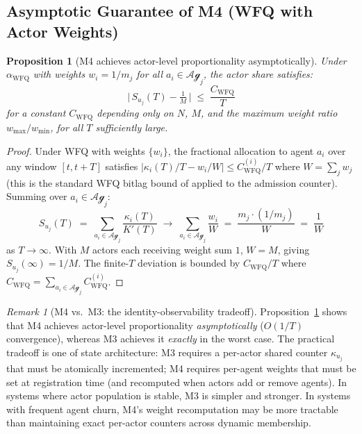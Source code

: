 \documentclass[11pt]{article}
\theoremstyle{plain}
\newtheorem{proposition}[theorem]{Proposition}
\theoremstyle{definition}
\theoremstyle{remark}
\newtheorem{remark}[theorem]{Remark}
\newcommand{\Agents}{\mathcal{Ag}}         %
\newcommand{\Share}[1]{S_{#1}}             %
\newcommand{\Kcap}{K}                      %
\newcommand{\alloc}{\alpha}                %
\begin{document}
\subsection{Asymptotic Guarantee of M4 (WFQ with Actor Weights)}
\label{sec:m4-analysis}

\begin{proposition}[M4 achieves actor-level proportionality asymptotically]
\label{prop:m4}
Under $\alloc_{\mathrm{WFQ}}$ with weights $w_i = 1/m_j$ for all
$a_i \in \Agents_j$, the actor share satisfies:
\[
  \bigl|\,\Share{u_j}(T) - \tfrac{1}{M}\,\bigr|
  \;\leq\; \frac{C_{\mathrm{WFQ}}}{T}
\]
for a constant $C_{\mathrm{WFQ}}$ depending only on $N$, $M$, and
the maximum weight ratio $w_{\max}/w_{\min}$, for all $T$ sufficiently
large.
\end{proposition}

\begin{proof}
Under WFQ with weights $\{w_i\}$, the fractional allocation to agent
$a_i$ over any window $[t, t+T]$ satisfies
$|\kappa_i(T)/T - w_i/W| \leq C_{\mathrm{WFQ}}^{(i)}/T$ where
$W = \sum_j w_j$ (this is the standard WFQ bitlag bound of
\citet{parekh93} applied to the admission counter).  Summing over
$a_i \in \Agents_j$:
\[
  \Share{u_j}(T) \;=\;
  \sum_{a_i \in \Agents_j} \frac{\kappa_i(T)}{\Kcap'(T)}
  \;\to\;
  \sum_{a_i \in \Agents_j} \frac{w_i}{W}
  \;=\; \frac{m_j \cdot (1/m_j)}{W} \;=\; \frac{1}{W}
\]
as $T \to \infty$.  With $M$ actors each receiving weight sum $1$,
$W = M$, giving $\Share{u_j}(\infty) = 1/M$.  The finite-$T$
deviation is bounded by $C_{\mathrm{WFQ}} / T$ where $C_{\mathrm{WFQ}}
= \sum_{a_i \in \Agents_j} C_{\mathrm{WFQ}}^{(i)}$.
\end{proof}

\begin{remark}[M4 vs.\ M3: the identity-observability tradeoff]
\label{rem:m4-vs-m3}
Proposition~\ref{prop:m4} shows that M4 achieves actor-level
proportionality \emph{asymptotically} ($O(1/T)$ convergence),
whereas M3 achieves it \emph{exactly} in the worst case.  The
practical tradeoff is one of state architecture: M3 requires a
per-actor shared counter $\kappa_{u_j}$ that must be atomically
incremented; M4 requires per-agent weights that must be set at
registration time (and recomputed when actors add or remove agents).
In systems where actor population is stable, M3 is simpler and
stronger.  In systems with frequent agent churn, M4's weight
recomputation may be more tractable than maintaining exact per-actor
counters across dynamic membership.
\end{remark}
\end{document}
